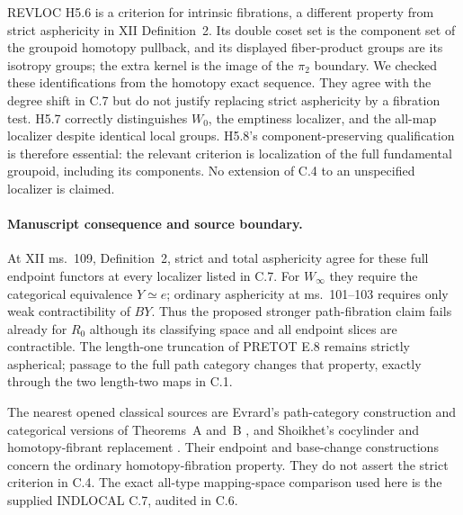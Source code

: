 REVLOC H5.6 is a criterion for intrinsic fibrations, a different
property from strict asphericity in XII Definition~2. Its double
coset set is the component set of the groupoid homotopy pullback,
and its displayed fiber-product groups are its isotropy groups;
the extra kernel is the image of the $\pi_2$ boundary. We checked
these identifications from the homotopy exact sequence. They
agree with the degree shift in C.7 but do not justify replacing
strict asphericity by a fibration test. H5.7 correctly distinguishes
$W_0$, the emptiness localizer, and the all-map localizer despite
identical local groups. H5.8's component-preserving qualification
is therefore essential: the relevant criterion is localization
of the full fundamental groupoid, including its components.
No extension of C.4 to an unspecified localizer is claimed.

\paragraph{Manuscript consequence and source boundary.}
At XII ms.~109, Definition~2, strict and total asphericity agree
for these full endpoint functors at every localizer listed in C.7.
For $W_\infty$ they require the categorical equivalence $Y\simeq e$;
ordinary asphericity at ms.~101--103 requires only weak
contractibility of $BY$. Thus the proposed stronger path-fibration
claim fails already for $R_0$ although its classifying space and
all endpoint slices are contractible. The length-one truncation
of PRETOT E.8 remains strictly aspherical; passage to the full
path category changes that property, exactly through the two
length-two maps in C.1.


The nearest opened classical sources are Evrard's path-category
construction and categorical versions of Theorems~A and~B
\cite{CDEvrard1975}, and Shoikhet's cocylinder and homotopy-fibrant
replacement \cite[Sections~2--3]{CDShoikhet2016}. Their endpoint
and base-change constructions concern the ordinary homotopy-fibration
property. They do not assert the strict criterion in C.4.
The exact all-type mapping-space comparison used here is the
supplied INDLOCAL C.7, audited in C.6.
